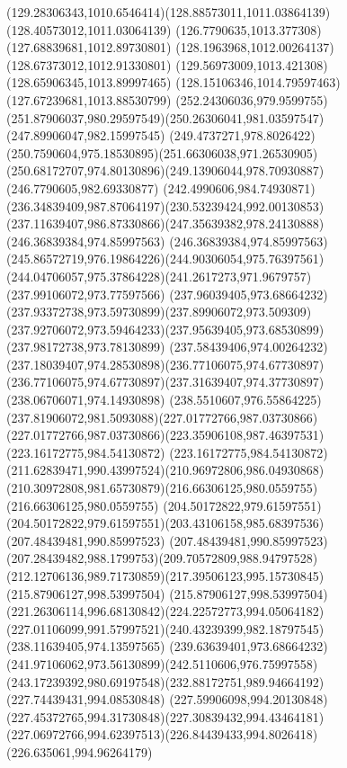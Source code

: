{{	\curveto(129.28306343,1010.6546414)(128.88573011,1011.03864139)(128.40573012,1011.03064139)
	\moveto(126.7790635,1013.377308)
	\lineto(127.68839681,1012.89730801)
	\lineto(128.1963968,1012.00264137)
	\lineto(128.67373012,1012.91330801)
	\lineto(129.56973009,1013.421308)
	\lineto(128.65906345,1013.89997465)
	\lineto(128.15106346,1014.79597463)
	\lineto(127.67239681,1013.88530799)
	\closepath
	\moveto(252.24306036,979.9599755)
	\curveto(251.87906037,980.29597549)(250.26306041,981.03597547)(247.89906047,982.15997545)
	\curveto(249.4737271,978.8026422)(250.7590604,975.18530895)(251.66306038,971.26530905)
	\curveto(250.68172707,974.80130896)(249.13906044,978.70930887)(246.7790605,982.69330877)
	\curveto(242.4990606,984.74930871)(236.34839409,987.87064197)(230.53239424,992.00130853)
	\curveto(237.11639407,986.87330866)(247.35639382,978.24130888)(246.36839384,974.85997563)
	\curveto(246.36839384,974.85997563)(245.86572719,976.19864226)(244.90306054,975.76397561)
	\curveto(244.04706057,975.37864228)(241.2617273,971.9679757)(237.99106072,973.77597566)
	\curveto(237.96039405,973.68664232)(237.93372738,973.59730899)(237.89906072,973.509309)
	\curveto(237.92706072,973.59464233)(237.95639405,973.68530899)(237.98172738,973.78130899)
	\curveto(237.58439406,974.00264232)(237.18039407,974.28530898)(236.77106075,974.67730897)
	\curveto(236.77106075,974.67730897)(237.31639407,974.37730897)(238.06706071,974.14930898)
	\curveto(238.5510607,976.55864225)(237.81906072,981.5093088)(227.01772766,987.03730866)
	\curveto(227.01772766,987.03730866)(223.35906108,987.46397531)(223.16172775,984.54130872)
	\curveto(223.16172775,984.54130872)(211.62839471,990.43997524)(210.96972806,986.04930868)
	\curveto(210.30972808,981.65730879)(216.66306125,980.0559755)(216.66306125,980.0559755)
	\lineto(204.50172822,979.61597551)
	\curveto(204.50172822,979.61597551)(203.43106158,985.68397536)(207.48439481,990.85997523)
	\curveto(207.48439481,990.85997523)(207.28439482,988.1799753)(209.70572809,988.94797528)
	\curveto(212.12706136,989.71730859)(217.39506123,995.15730845)(215.87906127,998.53997504)
	\curveto(215.87906127,998.53997504)(221.26306114,996.68130842)(224.22572773,994.05064182)
	\curveto(227.01106099,991.57997521)(240.43239399,982.18797545)(238.11639405,974.13597565)
	\curveto(239.63639401,973.68664232)(241.97106062,973.56130899)(242.5110606,976.75997558)
	\curveto(243.17239392,980.69197548)(232.88172751,989.94664192)(227.74439431,994.08530848)
	\curveto(227.59906098,994.20130848)(227.45372765,994.31730848)(227.30839432,994.43464181)
	\curveto(227.06972766,994.62397513)(226.84439433,994.8026418)(226.635061,994.96264179)
}}
